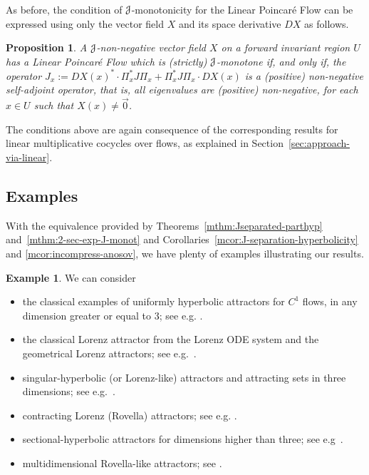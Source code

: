 \documentclass[12pt,reqno]{amsart}
\numberwithin{equation}{section}
\theoremstyle{plain}
\newtheorem{proposition}[theorem]{Proposition}
\theoremstyle{definition}
\newtheorem{example}{Example}
\newcommand{\J}{\EuScript{J}}
\begin{document}
As before, the condition of $\J$-monotonicity for the Linear
Poincar\'e Flow can be expressed using only the vector field
$X$ and its space derivative $DX$ as follows.

\begin{proposition}
  \label{pr:P-J-monotonous}
  A $\J$-non-negative vector field $X$ on a forward
  invariant region $U$ has a Linear Poincar\'e Flow which is (strictly)
  $\J$-monotone if, and only if, the operator $\hat J_x:=
  DX(x)^*\cdot \Pi_x^* J \Pi_x + \Pi_x^* J \Pi_x\cdot DX(x)$
  is a (positive) non-negative self-adjoint operator, that
  is, all eigenvalues are (positive) non-negative, for each
  $x\in U$ such that $X(x)\neq\vec0$.
\end{proposition}

The conditions above are again consequence of the corresponding
results for linear multiplicative cocycles over flows, as
explained in Section~\ref{sec:approach-via-linear}.



\subsection{Examples}
\label{sec:exampl}

With the equivalence provided by
Theorems~\ref{mthm:Jseparated-parthyp}
and~\ref{mthm:2-sec-exp-J-monot} and
Corollaries~\ref{mcor:J-separation-hyperbolicity} and
\ref{mcor:incompress-anosov}, we have plenty of examples
illustrating our results.


\begin{example}\label{ex:classical}
We can consider
\begin{itemize}
\item the classical examples of uniformly hyperbolic
  attractors for $C^1$ flows, in any dimension greater or
  equal to $3$; see e.g. \cite{BR75}.
\item the classical Lorenz attractor from the Lorenz ODE
  system and the geometrical Lorenz attractors; see
  e.g.~\cite{Lo63,Tu99,viana2000i}.
\item singular-hyperbolic (or Lorenz-like) attractors and
  attracting sets in three dimensions; see
  e.g.~\cite{MPP04,Morales07,AraPac2010}.
\item contracting Lorenz (Rovella) attractors; see
  e.g. \cite{Ro93,MetzMor06}.
\item sectional-hyperbolic attractors for dimensions higher
  than three; see e.g~\cite{BPV97,BDV2004,MeMor06}.
\item multidimensional Rovella-like attractors; see
  \cite{ACPP11}.
\end{itemize}
\end{example}
\end{document}
